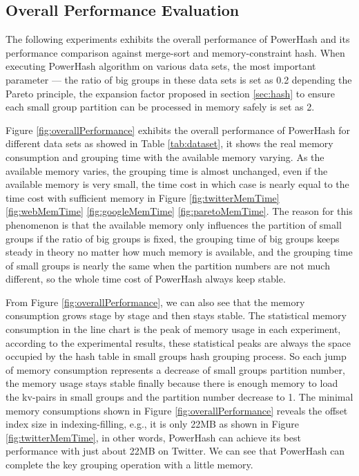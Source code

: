 \subsection{Overall Performance Evaluation}

The following experiments exhibits the overall performance of PowerHash and its performance comparison against merge-sort and memory-constraint hash. When executing PowerHash algorithm on various data sets, the most important parameter --- the ratio of big groups in these data sets is set as 0.2 depending the Pareto principle, the expansion factor proposed in section \ref{sec:hash} to ensure each small group partition can be processed in memory safely is set as 2. 

Figure \ref{fig:overallPerformance} exhibits the overall performance of PowerHash for different data sets as showed in Table \ref{tab:dataset}, it shows the real memory consumption and grouping time with the available memory varying. As the available memory varies, the grouping time is almost unchanged, even if the available memory is very small, the time cost in which case is nearly equal to the time cost with sufficient memory in Figure \ref{fig:twitterMemTime} \ref{fig:webMemTime} \ref{fig:googleMemTime} \ref{fig:paretoMemTime}. The reason for this phenomenon is that the available memory only influences the partition of small groups if the ratio of big groups is fixed, the grouping time of big groups keeps steady in theory no matter how much memory is available, and the grouping time of small groups is nearly the same when the partition numbers are not much different, so the whole time cost of PowerHash always keep stable. 

From Figure \ref{fig:overallPerformance}, we can also see that the memory consumption grows stage by stage and then stays stable. The statistical memory consumption in the line chart is the peak of memory usage in each experiment, according to the experimental results, these statistical peaks are always the space occupied by the hash table in small groups hash grouping process. So each jump of memory consumption represents a decrease of small groups partition number, the memory usage stays stable finally because there is enough memory to load the kv-pairs in small groups and the partition number decrease to 1. The minimal memory consumptions shown in Figure \ref{fig:overallPerformance} reveals the offset index size in indexing-filling, e.g., it is only 22MB as shown in Figure \ref{fig:twitterMemTime}, in other words, PowerHash can achieve its best performance with just about 22MB on Twitter. We can see that PowerHash can complete the key grouping operation with a little memory.
 
